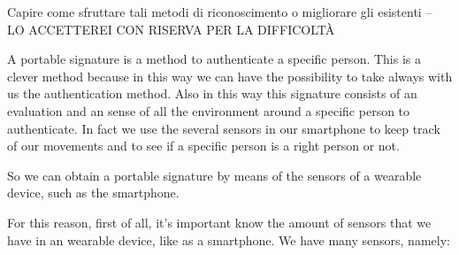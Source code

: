 \documentclass[12pt]{article}
\begin{document}
Capire come sfruttare tali metodi di riconoscimento o migliorare gli esistenti  -- LO ACCETTEREI CON RISERVA PER LA DIFFICOLTÀ

A portable signature is a method to authenticate a specific person. This is a clever method because in this way we can have the possibility to take always with us the authentication method. Also in this way this signature consists of an evaluation and an sense of all the environment around a specific person to authenticate. In fact we use the several sensors in our smartphone to keep track of our movements and to see if a specific person is a right person or not.

So we can obtain a portable signature by means of the sensors of a wearable device, such as the smartphone.

For this reason, first of all, it's important know the amount of sensors that we have in an wearable device, like as a smartphone. We have many sensors, namely:
\end{document}
